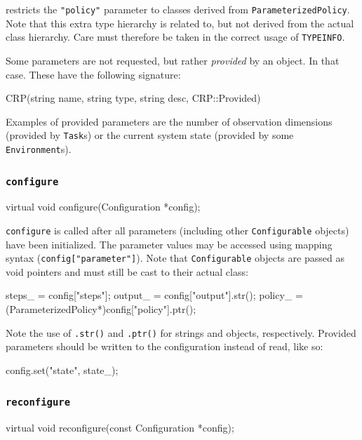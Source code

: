 \documentclass{article}
\newcommand{\txt}[1]{\texttt{#1}}
\newenvironment{code}{\alltt}{\endalltt}
\begin{document}
restricts the \txt{"policy"} parameter to classes derived from
\txt{ParameterizedPolicy}. Note that this extra type hierarchy is related
to, but not derived from the actual class hierarchy. Care must therefore be
taken in the correct usage of \txt{TYPEINFO}.

Some parameters are not requested, but rather \emph{provided} by an object. In
that case. These have the following signature:

\begin{code}
CRP(string name, string type, string desc, CRP::Provided)
\end{code}

Examples of provided parameters are the number of observation dimensions
(provided by \txt{Task}s) or the current system state (provided by some
\txt{Environment}s).

\subsubsection{\txt{configure}}

\begin{code}
virtual void configure(Configuration *config);
\end{code}

\txt{configure} is called after all parameters (including other
\txt{Configurable} objects) have been initialized. The parameter values may
be accessed using mapping syntax (\txt{config["parameter"]}). Note that
\txt{Configurable} objects are passed as void pointers and must still be cast to
their actual class:

\begin{code}
steps_ = config["steps"];  
output_ = config["output"].str();
policy_ = (ParameterizedPolicy*)config["policy"].ptr();
\end{code}

Note the use of \txt{.str()} and \txt{.ptr()} for strings and objects,
respectively. Provided parameters should be written to the configuration
instead of read, like so:

\begin{code}
config.set("state", state_);
\end{code}

\subsubsection{\txt{reconfigure}}
\begin{code}
virtual void reconfigure(const Configuration *config);
\end{code}
\end{document}
